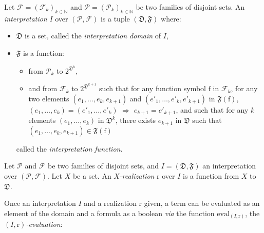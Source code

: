 \documentclass[a4paper]{llncs}
\begin{document}
  \begin{definition}[Interpretation]\label{def interpretation}
    Let $\mathcal{F}=(\mathcal{F}_k)_{k\in\mathbb{N}}$ and $\mathcal{P}=(\mathcal{P}_k)_{k\in\mathbb{N}}$ be two families of disjoint sets. An \emph{interpretation} $I$ over $(\mathcal{P},\mathcal{F})$ is a tuple $(\mathfrak{D},\mathfrak{F})$ where:
    \begin{itemize}
      \item $\mathfrak{D}$ is a set, called the \emph{interpretation domain} of $I$,
      \item $\mathfrak{F}$ is a function:
        \begin{itemize}
          \item from $\mathcal{P}_k$ to $2^{\mathfrak{D}^k}$,
          \item and from $\mathcal{F}_k$ to $2^{\mathfrak{D}^{k+1}}$ such that for any function symbol $\mathrm{f}$ in $\mathcal{F}_k$, for any two elements $(e_1,\ldots,e_k,e_{k+1})$ and $(e'_1,\ldots,e'_k,e'_{k+1})$ in $\mathfrak{F}(\mathrm{f})$, $(e_1,\ldots,e_k)=(e'_1,\ldots,e'_k)$ $\Rightarrow$ $e_{k+1}=e'_{k+1}$, and such that for any $k$ elements $(e_1,\ldots,e_k)$ in $\mathfrak{D}^k$, there exists $e_{k+1}$ in $\mathfrak{D}$ such that $(e_1,\ldots,e_k,e_{k+1})\in \mathfrak{F}(\mathrm{f})$  
        \end{itemize}
        called the \emph{interpretation function}.
    \end{itemize}
  \end{definition}
  
  \begin{definition}[Realization]
    Let $\mathcal{P}$ and $\mathcal{F}$ be two families of disjoint sets, and $I=(\mathfrak{D},\mathfrak{F})$ an interpretation over $(\mathcal{P},\mathcal{F})$. Let $X$ be a set. An $X$-\emph{realization} $\mathrm{r}$ over $I$ is a function from $X$ to $\mathfrak{D}$.
  \end{definition}
  
  Once an interpretation $I$ and a realization $\mathrm{r}$ given, a term can be evaluated as an element of the domain and a formula as a boolean \emph{via} the function $\mathrm{eval}_{(I,\mathrm{r})}$, the $(I,\mathrm{r})$\emph{-evaluation}:
  
\end{document}
